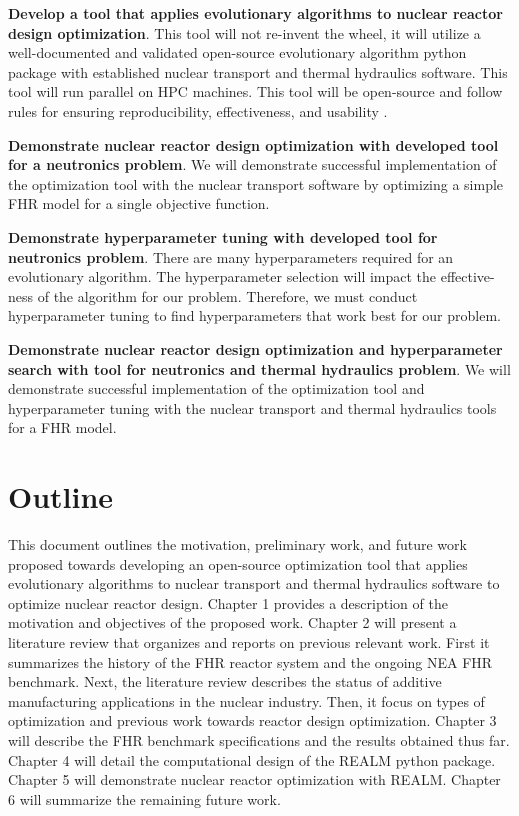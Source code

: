 \vspace{0.2cm} 
\noindent
\textbf{Develop a tool that applies evolutionary algorithms to nuclear 
reactor design optimization}. 
This tool will not re-invent the wheel, it will utilize a well-documented 
and validated open-source evolutionary algorithm python package with established 
nuclear transport and thermal hydraulics software. This tool will run parallel on 
\gls{HPC} machines. This tool will be open-source and follow rules for ensuring 
reproducibility, effectiveness, and usability 
\cite{list_ten_2017,osborne_ten_2014,sandve_ten_2013}. 

\vspace{0.2cm} 
\noindent
\textbf{Demonstrate nuclear reactor design optimization with developed tool 
for a neutronics problem}. 
We will demonstrate successful implementation of the optimization tool with the 
nuclear transport software by optimizing a simple \gls{FHR} model for a single 
objective function. 

\vspace{0.2cm} 
\noindent
\textbf{Demonstrate hyperparameter tuning with developed tool for neutronics problem}.
There are many hyperparameters required for an evolutionary algorithm. 
The hyperparameter selection will impact the effective-ness of the algorithm 
for our problem. 
Therefore, we must conduct hyperparameter tuning to find hyperparameters that work 
best for our problem. 

\vspace{0.2cm} 
\noindent
\textbf{Demonstrate nuclear reactor design optimization and hyperparameter 
search with tool for neutronics and thermal hydraulics problem}.
We will demonstrate successful implementation of the optimization tool and 
hyperparameter tuning with the nuclear transport and thermal hydraulics tools 
for a \gls{FHR} model.  


\section{Outline}
This document outlines the motivation, preliminary work, and future work proposed 
towards developing an open-source optimization tool that applies evolutionary 
algorithms to nuclear transport and thermal hydraulics software to optimize 
nuclear reactor design. 
Chapter 1 provides a description of the motivation and objectives of the 
proposed work. 
Chapter 2 will present a literature review that organizes and reports on previous 
relevant work. 
First it summarizes the history of the \gls{FHR} reactor system and the ongoing 
\gls{NEA} \gls{FHR} benchmark. 
Next, the literature review describes the status of additive manufacturing 
applications in the nuclear industry. 
Then, it focus on types of optimization and previous work towards reactor design
optimization. 
Chapter 3 will describe the \gls{FHR} benchmark specifications and the results 
obtained thus far. 
Chapter 4 will detail the computational design of the REALM python package. 
Chapter 5 will demonstrate nuclear reactor optimization with REALM. 
Chapter 6 will summarize the remaining future work. 
